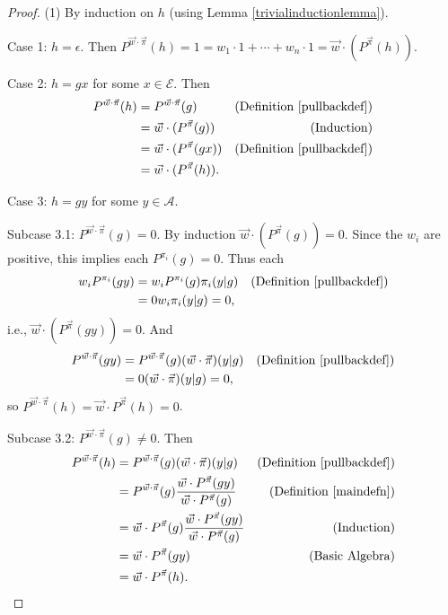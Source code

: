 \documentclass[twoside]{article}
\begin{document}
\begin{proof}
    (1) By induction on $h$ (using Lemma \ref{trivialinductionlemma}).

    Case 1: $h=\epsilon$. Then
    $P^{\vec w\cdot\vec\pi}(h)=1=w_1\cdot 1+\cdots+w_n\cdot 1
    =\vec w\cdot ({P^{\vec\pi}}(h))$.

    Case 2: $h=gx$ for some $x\in\mathcal E$. Then
    \begin{align*}
        P^{\vec w\cdot\vec\pi}(h)
            &= P^{\vec w\cdot\vec\pi}(g)
                &\mbox{(Definition \ref{pullbackdef})}\\
            &= \vec w\cdot({P^{\vec\pi}}(g))
                &\mbox{(Induction)}\\
            &= \vec w\cdot({P^{\vec\pi}}(gx))
                &\mbox{(Definition \ref{pullbackdef})}\\
            &= \vec w\cdot({P^{\vec\pi}}(h)).
    \end{align*}

    Case 3: $h=gy$ for some $y\in\mathcal A$.

    Subcase 3.1: $P^{\vec w\cdot\vec\pi}(g)=0$.
        By induction $\vec w\cdot({P^{\vec\pi}}(g))=0$.
        Since the $w_i$ are positive, this implies
        each $P^{\pi_i}(g)=0$.
        Thus each
        \begin{align*}
            w_i P^{\pi_i}(gy)
                &= w_i P^{\pi_i}(g)\pi_i(y|g)
                    &\mbox{(Definition \ref{pullbackdef})}\\
                &= 0w_i\pi_i(y|g)=0,
        \end{align*}
        i.e., $\vec w\cdot({P^{\vec\pi}}(gy))=0$.
        And
        \begin{align*}
            P^{\vec w\cdot\vec\pi}(gy)
                &= P^{\vec w\cdot\vec\pi}(g)(\vec w\cdot\vec\pi)(y|g)
                    &\mbox{(Definition \ref{pullbackdef})}\\
                &= 0(\vec w\cdot\vec\pi)(y|g) = 0,
        \end{align*}
        so $P^{\vec w\cdot\vec\pi}(h)=\vec w\cdot P^{\vec\pi}(h)=0$.

    Subcase 3.2: ${P^{\vec w\cdot\vec\pi}}(g)\not=0$. Then
    \begin{align*}
        P^{\vec w\cdot\vec\pi}(h)
            &= P^{\vec w\cdot\vec\pi}(g)(\vec w\cdot\vec\pi)(y|g)
                &\mbox{(Definition \ref{pullbackdef})}\\
            &= P^{\vec w\cdot\vec\pi}(g)
                \frac
                {\vec w\cdot {P^{\vec\pi}}(gy)}
                {\vec w\cdot {P^{\vec\pi}}(g)}
                &\mbox{(Definition \ref{maindefn})}\\
            &= \vec w\cdot {P^{\vec\pi}}(g)
                \frac
                {\vec w\cdot {P^{\vec\pi}}(gy)}
                {\vec w\cdot {P^{\vec\pi}}(g)}
                &\mbox{(Induction)}\\
            &= \vec w\cdot {P^{\vec\pi}}(gy)
                &\mbox{(Basic Algebra)}\\
            &= \vec w\cdot {P^{\vec\pi}}(h).
    \end{align*}


\end{proof}
\end{document}
